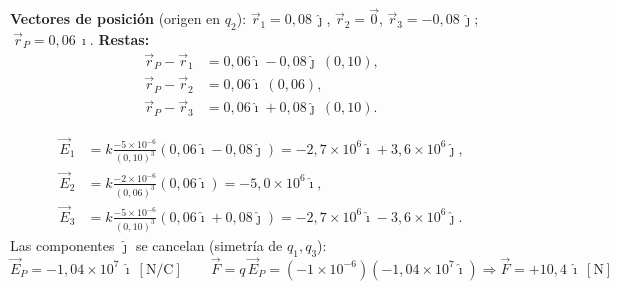 \documentclass[12pt,letterpaper]{article}
\begin{document}
\medskip
\noindent
\begin{minipage}[t]{0.34\textwidth}
\centering\vspace{0pt}
\end{minipage}%
\hfill
\begin{minipage}[t]{0.62\textwidth}
\vspace{0pt}
\textbf{Vectores de posici\'on} (origen en $q_2$): $\vec r_1=0{,}08\,\hat\jmath$, $\vec r_2=\vec 0$,
$\vec r_3=-0{,}08\,\hat\jmath$; $\ \vec r_P=0{,}06\,\hat\imath$.
\smallskip
\textbf{Restas:}
\begin{align*}
    \vec r_P-\vec r_1 &= 0{,}06\hat\imath-0{,}08\hat\jmath\ (0{,}10),\\
    \vec r_P-\vec r_2 &= 0{,}06\hat\imath\ (0{,}06),\\
    \vec r_P-\vec r_3 &= 0{,}06\hat\imath+0{,}08\hat\jmath\ (0{,}10).
\end{align*}
\end{minipage}

\begin{align*}
    \vec E_1 &= k\frac{-5\times10^{-6}}{(0{,}10)^{3}}(0{,}06\hat\imath-0{,}08\hat\jmath) = -2{,}7\times10^{6}\hat\imath+3{,}6\times10^{6}\hat\jmath,\\
    \vec E_2 &= k\frac{-2\times10^{-6}}{(0{,}06)^{3}}(0{,}06\hat\imath) = -5{,}0\times10^{6}\hat\imath,\\
    \vec E_3 &= k\frac{-5\times10^{-6}}{(0{,}10)^{3}}(0{,}06\hat\imath+0{,}08\hat\jmath) = -2{,}7\times10^{6}\hat\imath-3{,}6\times10^{6}\hat\jmath.
\end{align*}
Las componentes $\hat\jmath$ se cancelan (simetr\'ia de $q_1,q_3$):
\[
    \boxed{\vec E_P = -1{,}04\times10^{7}\,\hat\imath\ [\text{N/C}]}\qquad
    \vec F = q\,\vec E_P = (-1\times10^{-6})(-1{,}04\times10^{7}\hat\imath)
    \Rightarrow \boxed{\vec F = +10{,}4\,\hat\imath\ [\text{N}]}
\]
\end{document}

